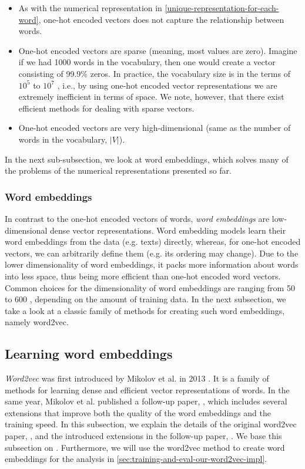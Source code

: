 \begin{itemize}
    \item As with the numerical representation in \cref{unique-representation-for-each-word}, one-hot encoded vectors does not capture the relationship between words.
    \item One-hot encoded vectors are sparse (meaning, most values are zero). Imagine if we had 1000 words in the vocabulary, then one would create a vector consisting of 99.9\% zeros. In practice, the vocabulary size is in the terms of $10^5$ to $10^7$ \cite{mikolov2013b}, i.e., by using one-hot encoded vector representations we are extremely inefficient in terms of space. We note, however, that there exist efficient methods for dealing with sparse vectors.
    \item One-hot encoded vectors are very high-dimensional (same as the number of words in the vocabulary, $|V|$).
\end{itemize}
In the next sub-subsection, we look at word embeddings, which solves many of the problems of the numerical representations presented so far.

\subsubsection{Word embeddings}
In contrast to the one-hot encoded vectors of words, \textit{word embeddings} are low-dimensional dense vector representations. Word embedding models learn their word embeddings from the data (e.g. texts) directly, whereas, for one-hot encoded vectors, we can arbitrarily define them (e.g. its ordering may change). Due to the lower dimensionality of word embeddings, it packs more information about words into less space, thus being more efficient than one-hot encoded word vectors. Common choices for the dimensionality of word embeddings are ranging from 50 to 600 \cite{mikolov2013a}, depending on the amount of training data. In the next subsection, we take a look at a classic family of methods for creating such word embeddings, namely word2vec.

\subsection{Learning word embeddings}
\label{sec:word2vec}
\textit{Word2vec} was first introduced by Mikolov et al. in 2013 \cite{mikolov2013a}. It is a family of methods for learning dense and efficient vector representations of words. In the same year, Mikolov et al. published a follow-up paper, \cite{mikolov2013b}, which includes several extensions that improve both the quality of the word embeddings and the training speed. In this subsection, we explain the details of the original word2vec paper, \cite{mikolov2013a}, and the introduced extensions in the follow-up paper, \cite{mikolov2013b}. We base this subsection on \cites{mikolov2013a}{mikolov2013b}. Furthermore, we will use the word2vec method to create word embeddings for the analysis in \cref{sec:training-and-eval-our-word2vec-impl}.

